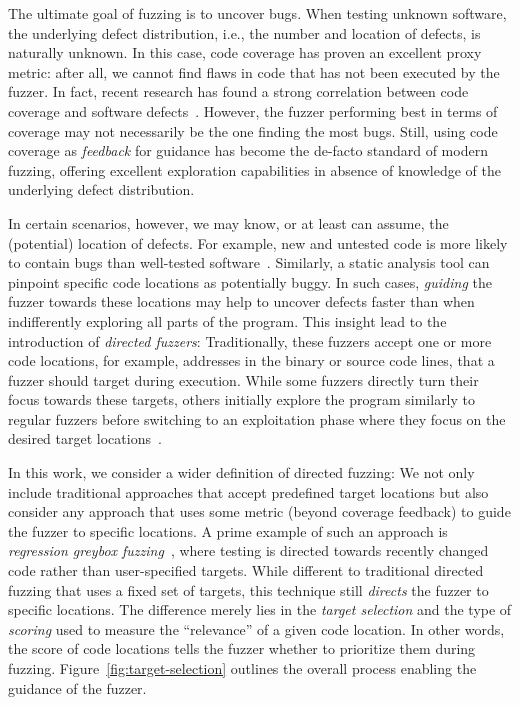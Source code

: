 The ultimate goal of fuzzing is to uncover bugs. When testing unknown software, the underlying defect distribution, i.e., the number and location of defects, is naturally unknown. In this case, code coverage has proven an excellent proxy metric: after all, we cannot find flaws in code that has not been executed by the fuzzer. In fact, recent research has found a strong correlation between code coverage and software defects~\cite{BöhSzeMet22}. However, the fuzzer performing best in terms of coverage may not necessarily be the one finding the most bugs. Still, using code coverage as \emph{feedback} for guidance has become the de-facto standard of modern fuzzing, offering excellent exploration capabilities in absence of knowledge of the underlying defect distribution.

In certain scenarios, however, we may know, or at least can assume, the (potential) location of defects. For example, new and untested code is more likely to contain bugs than well-tested software~\cite{ZhuBöh21}. Similarly, a static analysis tool can pinpoint specific code locations as potentially buggy. In such cases, \emph{guiding} the fuzzer towards these locations may help to uncover defects faster than when indifferently exploring all parts of the program. This insight lead to the introduction of \emph{directed fuzzers}: Traditionally, these fuzzers accept one or more code locations, for example, addresses in the binary or source code lines, that a fuzzer should target during execution. While some fuzzers directly turn their focus towards these targets, others initially explore the program similarly to regular fuzzers before switching to an exploitation phase where they focus on the desired target locations~\cite{BöhPhaNguRoy+17}. 

In this work, we consider a wider definition of directed fuzzing: We not only include traditional approaches that accept predefined target locations but also consider any approach that uses some metric (beyond coverage feedback) to guide the fuzzer to specific locations. A prime example of such an approach is \emph{regression greybox fuzzing}~\cite{ZhuBöh21}, where testing is directed towards recently changed code rather than user-specified targets. While different to traditional directed fuzzing that uses a fixed set of targets, this technique still \emph{directs} the fuzzer to specific locations. The difference merely lies in the \emph{target selection} and the type of \emph{scoring} used to measure the ``relevance'' of a given code location. In other words, the score of code locations tells the fuzzer whether to prioritize them during fuzzing. 
Figure~\ref{fig:target-selection} outlines the overall process enabling the guidance of the fuzzer. 

